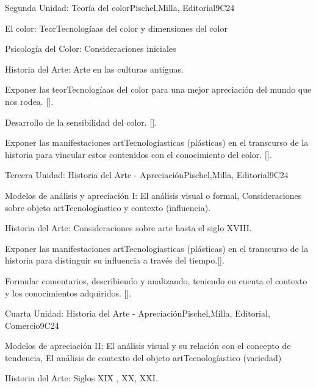 \begin{syllabus}
\begin{unit}{}{Segunda Unidad: Teoría del color}{Pischel,Milla, Editorial}{9}{C24}
\begin{topics}
	\item El color: TeorTecnologíaas del color y dimensiones del color
	\item Psicología del Color: Consideraciones iniciales
	\item Historia del Arte: Arte en las culturas antiguas.
\end{topics}
\begin{learningoutcomes}
	\item Exponer las teorTecnologíaas del color para una mejor apreciación del mundo que nos rodea. [\Usage].
	\item Desarrollo de la sensibilidad del color. [\Usage].
	\item Exponer las manifestaciones  artTecnologíasticas (plásticas) en el transcurso de la historia para vincular estos contenidos con el conocimiento del color.
 [\Usage].
\end{learningoutcomes}
\end{unit}

\begin{unit}{}{Tercera Unidad: Historia del Arte - Apreciación}{Pischel,Milla, Editorial}{9}{C24}
\begin{topics}
	\item Modelos de análisis y apreciación I: El análisis visual o formal, Consideraciones sobre objeto artTecnologíastico y contexto (influencia).
	\item Historia del Arte: Consideraciones sobre arte hasta el siglo  XVIII.
\end{topics}
\begin{learningoutcomes}
	\item Exponer las manifestaciones  artTecnologíasticas (plásticas) en el transcurso de la historia para distinguir su influencia a través del tiempo.[\Usage].
	\item Formular comentarios, describiendo y analizando, teniendo en cuenta el contexto y los conocimientos adquiridos. [\Usage].
\end{learningoutcomes}
\end{unit}

\begin{unit}{}{Cuarta Unidad: Historia del Arte - Apreciación}{Pischel,Milla, Editorial, Comercio}{9}{C24}
\begin{topics}
	\item Modelos de apreciación II: El análisis visual y su relación con el concepto de tendencia,  El análisis de contexto del objeto artTecnologíastico (variedad)
	\item Historia del Arte: Siglos  XIX , XX, XXI.
\end{topics}


\end{unit}
\end{syllabus}
